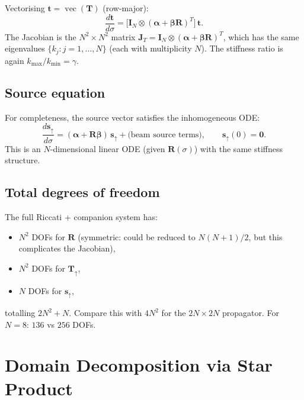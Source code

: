 \documentclass[11pt,a4paper]{article}
\newcommand{\vect}[1]{\bm{#1}}
\newcommand{\mat}[1]{\mathbf{#1}}
\newcommand{\kmax}{k_{\max}}
\newcommand{\kmin}{k_{\min}}
\theoremstyle{definition}
\begin{document}
Vectorising $\vect{t}=\operatorname{vec}(\mat{T})$ (row-major):
\begin{equation}\label{eq:T_vec}
  \frac{d\vect{t}}{d\sigma}
  = \bigl[\mat{I}_N\otimes(\mat{\alpha}+\mat{\beta}\mat{R})^T\bigr]\,\vect{t}.
\end{equation}
The Jacobian is the $N^2\!\times\!N^2$ matrix
$\mat{J}_T = \mat{I}_N\otimes(\mat{\alpha}+\mat{\beta}\mat{R})^T$,
which has the same eigenvalues $\{k_j : j=1,\ldots,N\}$ (each with
multiplicity $N$).  The stiffness ratio is again $\kmax/\kmin=\gamma$.

\subsection{Source equation}

For completeness, the source vector satisfies the inhomogeneous ODE:
\begin{equation}\label{eq:s_ode}
  \frac{d\vect{s}_\uparrow}{d\sigma}
  = (\mat{\alpha}+\mat{R}\mat{\beta})\,\vect{s}_\uparrow
  + \text{(beam source terms)},
  \qquad \vect{s}_\uparrow(0) = \vect{0}.
\end{equation}
This is an $N$-dimensional linear ODE (given $\mat{R}(\sigma)$) with
the same stiffness structure.

\subsection{Total degrees of freedom}

The full Riccati + companion system has:
\begin{itemize}[nosep]
\item $N^2$ DOFs for $\mat{R}$ (symmetric: could be reduced to
  $N(N+1)/2$, but this complicates the Jacobian),
\item $N^2$ DOFs for $\mat{T}_\uparrow$,
\item $N$ DOFs for $\vect{s}_\uparrow$,
\end{itemize}
totalling $2N^2+N$.  Compare this with $4N^2$ for the
$2N\!\times\!2N$ propagator.  For $N=8$: $136$ vs $256$ DOFs.


\section{Domain Decomposition via Star Product}
\label{sec:decomposition}
\end{document}

